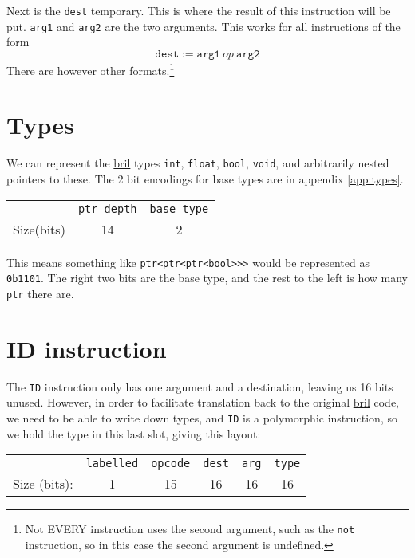 \documentclass{article}
\newcommand{\bril}{\href{https://capra.cs.cornell.edu/bril/}{bril}}
\begin{document}
Next is the \texttt{dest} temporary. This is where the result of this
instruction will be put. \texttt{arg1} and \texttt{arg2} are the two
arguments. This works for all instructions of the form
\[
  \texttt{dest} := \texttt{arg1}\ op\ \texttt{arg2}
\]
There are however other formats.\footnote{Not EVERY instruction uses the second
  argument, such as the \texttt{not} instruction, so in this case the second
  argument is undefined.}
\section{Types}
\label{sec:types}
We can represent the \bril{} types \texttt{int}, \texttt{float}, \texttt{bool},
\texttt{void}, and arbitrarily nested pointers to these. The 2 bit encodings for
base types are in appendix \ref{app:types}.
\begin{center}
  \begin{tabular}{r|c|c|}
    \cline{2-3}
    & \texttt{ptr depth} & \texttt{base type}\\ \cline{2-3}
    Size(bits) & 14 & 2
  \end{tabular}
\end{center}
This means something like \texttt{ptr<ptr<ptr<bool>>>} would be represented as
\texttt{0b1101}. The right two bits are the base type, and the rest to the left
is how many \texttt{ptr} there are.

\section{ID instruction}
The \texttt{ID} instruction only has one argument and a destination, leaving us
16 bits unused. However, in order to facilitate translation back to the original
\bril{} code, we need to be able to write down types, and \texttt{ID} is a
polymorphic instruction, so we hold the type in this last slot, giving this
layout:
\begin{center}
  \begin{tabular}{r|c|c|c|c|c|}
    \cline{2-6}
    & \texttt{labelled} & \texttt{opcode} & \texttt{dest} & \texttt{arg}
    & \texttt{type} \\ \cline{2-6}
    Size (bits): & 1 & 15 & 16 & 16 & 16 \\ \cline{2-6}
  \end{tabular}
\end{center}
\end{document}

